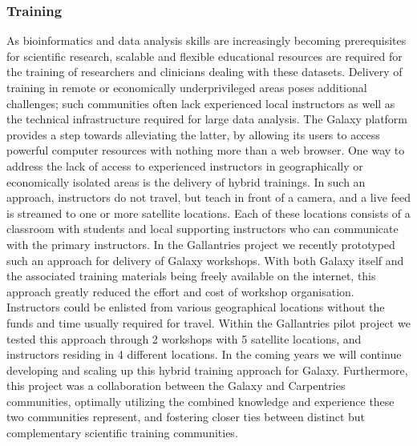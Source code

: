 \subsubsection{Training}
As bioinformatics and data analysis skills are increasingly becoming prerequisites for scientific research, scalable and flexible educational resources are required for the training of researchers and clinicians dealing with these datasets.
Delivery of training in remote or economically underprivileged areas poses additional challenges; such communities often lack experienced local instructors as well as the technical infrastructure required for large data analysis.
The Galaxy platform provides a step towards alleviating the latter, by allowing its users to access powerful computer resources with nothing more than a web browser. One way to address the lack of access to experienced instructors in geographically or economically isolated areas is the delivery of hybrid trainings.
In such an approach, instructors do not travel, but teach in front of a camera, and a live feed is streamed to one or more satellite locations. Each of these locations consists of a classroom with students and local supporting instructors who can communicate with the primary instructors. In the Gallantries project \cite{gallantries} we recently prototyped such an approach for delivery of Galaxy workshops.
With both Galaxy itself and the associated training materials being freely available on the internet, this approach greatly reduced the effort and cost of workshop organisation.
Instructors could be enlisted from various geographical locations without the funds and time usually required for travel. Within the Gallantries pilot project we tested this approach through 2 workshops with 5 satellite locations, and instructors residing in 4 different locations.
In the coming years we will continue developing and scaling up this hybrid training approach for Galaxy. Furthermore, this project was a collaboration between the Galaxy and Carpentries \cite{wilson2006software} communities, optimally utilizing the combined knowledge and experience these two communities represent, and fostering closer ties between distinct but complementary scientific training communities.


